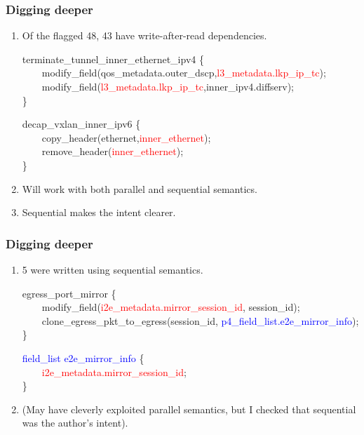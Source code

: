 \documentclass[aspectratio=169]{beamer}
\begin{document}
\begin{frame}[fragile]
  \frametitle{Digging deeper}
  \begin{enumerate}
    \item<1-> Of the flagged 48, 43 have write-after-read dependencies.
      \begin{texttt}
      terminate\_tunnel\_inner\_ethernet\_ipv4 \{ \\
        \ \ \ \ modify\_field(qos\_metadata.outer\_dscp,\textcolor{red}{l3\_metadata.lkp\_ip\_tc}); \\
        \ \ \ \ modify\_field(\textcolor{red}{l3\_metadata.lkp\_ip\_tc},inner\_ipv4.diffserv); \\
      \}
      \end{texttt}

      \begin{texttt}
      decap\_vxlan\_inner\_ipv6 \{ \\
        \ \ \ \  copy\_header(ethernet,\textcolor{red}{inner\_ethernet}); \\
        \ \ \ \  remove\_header(\textcolor{red}{inner\_ethernet}); \\
      \}
    \end{texttt}
    \item<2-> Will work with both parallel and sequential semantics.
    \item<3-> Sequential makes the intent clearer.
  \end{enumerate}
\end{frame}

\begin{frame}[fragile]
  \frametitle{Digging deeper}
  \begin{enumerate}
    \item<1-> 5 were written using sequential semantics.\\
      \begin{scriptsize}
      \begin{texttt}
        egress\_port\_mirror \{  \\
        \ \ \ \  modify\_field(\textcolor{red}{i2e\_metadata.mirror\_session\_id}, session\_id); \\
        \ \ \ \  clone\_egress\_pkt\_to\_egress(session\_id, \textcolor{blue}{p4\_field\_list.e2e\_mirror\_info}); \\
        \}

        \textcolor{blue}{field\_list e2e\_mirror\_info} \{ \\
          \ \ \ \ \textcolor{red}{i2e\_metadata.mirror\_session\_id}; \\
        \}
      \end{texttt}
      \end{scriptsize}
    \item<2-> (May have cleverly exploited parallel semantics,
               but I checked that sequential was the author's intent).
  \end{enumerate}
\end{frame}
\end{document}
